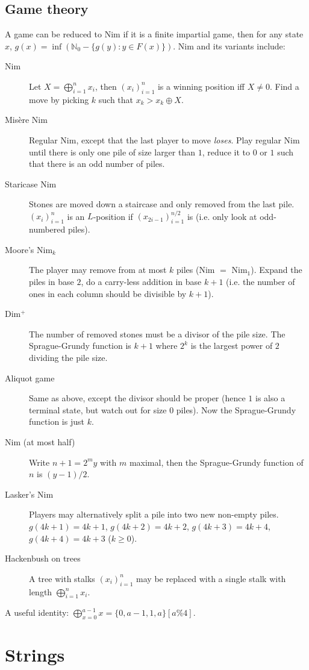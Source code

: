 \documentclass[
	a4paper,
	landscape,
	twoside,
	10pt,
	article
]{article}
\begin{document}
\subsection{Game theory}
A game can be reduced to Nim if it is a finite impartial game, then for any state $x$, $g(x) = \inf (\mathbb{N}_0 - \{g(y) : y \in F(x) \})$. Nim and its variants include:
\begin{description}
	\item[Nim] Let $X = \bigoplus_{i=1}^n x_i$, then $(x_i)_{i=1}^n$ is a winning position iff $X\neq 0$. Find a move by picking $k$ such that $x_k > x_k \oplus X$.
    \item[Misère Nim] Regular Nim, except that the last player to move \textit{loses}. Play regular Nim until there is only one pile of size larger than $1$, reduce it to $0$ or $1$ such that there is an odd number of piles.
    \item[Staricase Nim] Stones are moved down a staircase and only removed from the last pile. $(x_i)_{i=1}^n$ is an $L$-position if $(x_{2i-1})_{i=1}^{n/2}$ is (i.e. only look at odd-numbered piles).
    \item[Moore's Nim$_k$] The player may remove from at most $k$ piles (Nim $=$ Nim$_1$). Expand the piles in base $2$, do a carry-less addition in base $k+1$ (i.e. the number of ones in each column should be divisible by $k+1$).
    \item[Dim$^+$] The number of removed stones must be a divisor of the pile size. The Sprague-Grundy function is $k+1$ where $2^k$ is the largest power of $2$ dividing the pile size.
    \item[Aliquot game] Same as above, except the divisor should be proper (hence $1$ is also a terminal state, but watch out for size $0$ piles). Now the Sprague-Grundy function is just $k$.
    \item[Nim (at most half)] Write $n+1 = 2^my$ with $m$ maximal, then the Sprague-Grundy function of $n$ is $(y - 1) / 2$.
    \item[Lasker's Nim] Players may alternatively split a pile into two new non-empty piles. $g(4k+1) = 4k+1$, $g(4k+2) = 4k+2$, $g(4k+3) = 4k+4$, $g(4k+4) = 4k+3$ ($k\geq 0$).
    \item[Hackenbush on trees] A tree with stalks $(x_i)_{i=1}^n$ may be replaced with a single stalk with length $\bigoplus_{i=1}^n x_i$.
\end{description}
A useful identity: $\bigoplus_{x=0}^{a - 1} x = \{0, a - 1, 1, a\}[a \% 4]$.

\section{Strings}
\end{document}
